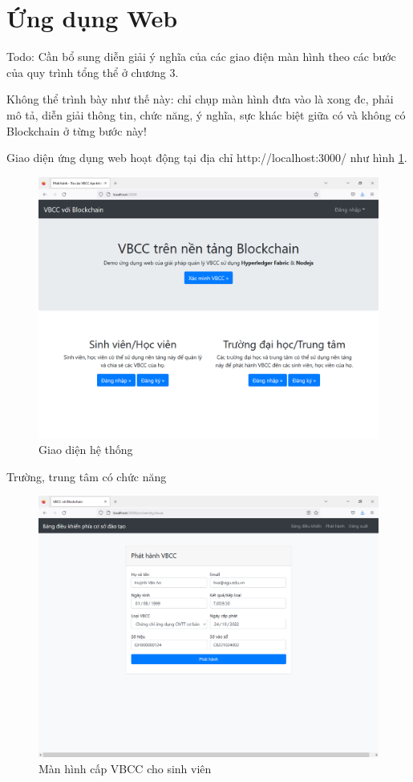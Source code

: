 \section{Ứng dụng Web}

{\color{red} Todo: Cần bổ sung diễn giải ý nghĩa của các giao điện màn hình theo các bước của quy trình tổng thể ở chương 3.

Không thể trình bày như thế này: chỉ chụp màn hình đưa vào là xong đc, phải mô tả, diễn giải thông tin, chức năng, ý nghĩa, sực khác biệt giữa có và không có Blockchain ở từng bước này!
}

Giao diện ứng dụng web hoạt động tại địa chỉ http://localhost:3000/ như hình \ref{fig:main_vbcc}. 

\begin{figure}[H]
\centering
\includegraphics[width=.9\linewidth]{img/main_vbcc.png}
\caption{Giao diện hệ thống}
\label{fig:main_vbcc}
\end{figure}

Trường, trung tâm có chức năng

\begin{figure}[H]
\centering
\includegraphics[width=.9\linewidth]{img/tt_phathanh.PNG}
\caption{Màn hình cấp VBCC cho sinh viên}
\label{fig:tt_phathanh}
\end{figure}

